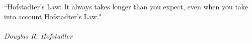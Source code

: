 \clearpage

\narrowlinespacing

\vspace*{4mm}

``Hofstadter's Law: It always takes longer than you expect, even when you take into account Hofstadter's Law."\\
\\
\emph{Douglas R. Hofstadter}

\normallinespacing